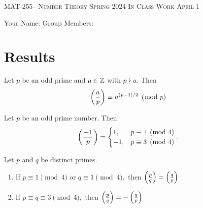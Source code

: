 \documentclass[handout]{ximera}
\date{April 1, 2024}
\begin{document}
\handoutAbstract
\maketitle
 	\begin{center}%
    	{\large \scshape MAT-255-- Number Theory 
			\hfill Spring 2024 
			\hfill In Class Work April 1}%
    
		{\large Your Name: \hrulefill \quad 
			Group Members:\hrulefill \quad 
			\hrulefill
			\par}%
 	\end{center}%
	 
\section*{Results}
\begin{theorem}\label{thm:euler-quads}
	Let $p$ be an odd prime and $a\in\mathbb Z$ with $p\nmid a.$ Then \[\left(\frac{a}{p}\right)\equiv a^{(p-1)/2}\pmod{p}\]
\end{theorem}


\begin{thm*}[Theorem 4.6]\label{thm:residue-neg1}
	Let $p$ be an odd prime number. Then 
	\[
		\left(\frac{-1}{p}\right)=
			\begin{cases}
 				1, & p\equiv 1\pmod{4}\\
				-1, & p\equiv 3\pmod{4}
			\end{cases}.
	\]
\end{thm*}

\begin{thm*}\label{quad-rec}
	Let $p$ and $q$ be distinct primes.  
	\begin{enumerate}[label=(\alph*)]
		\item If $p\equiv 1 \pmod{4}$ or $q\equiv 1\pmod{4},$ then $\left(\frac{p}{q}\right)=\left(\frac{q}{p}\right)$
 		\item If $p\equiv q \equiv 3 \pmod{4},$ then $\left(\frac{p}{q}\right)=-\left(\frac{q}{p}\right)$
	\end{enumerate}
\end{thm*}
\end{document}
